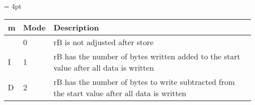 {
\tabulinesep = 4pt
\begin{tabu} to \linewidth { X[-2c]  X[-1c]  X[l] }
m & Mode & Description \\
\hline
 & 0 & rB is not adjusted after store \\
I & 1 & rB has the number of bytes written added to the start value after all data is written \\
D & 2 & rB has the number of bytes to write subtracted from the start value after all data is written \\
\end{tabu}
}